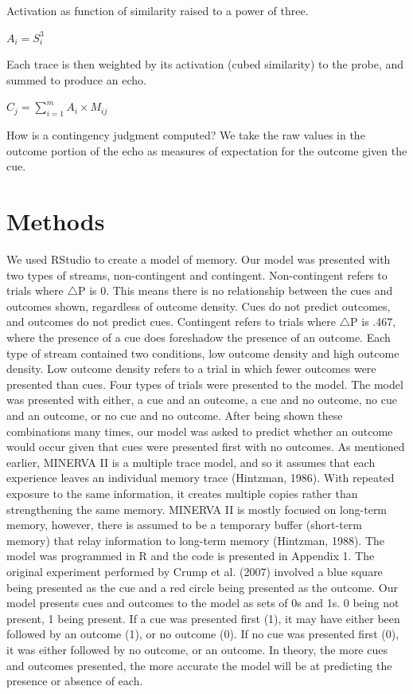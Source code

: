 \documentclass[
  english,
  man,floatsintext]{apa6}
\begin{document}
Activation as function of similarity raised to a power of three.

\(A_i = S_i^3\)

Each trace is then weighted by its activation (cubed similarity) to the probe, and summed to produce an echo.

\(C_j = \sum_{i=1}^m A_i \times M_{ij}\)

How is a contingency judgment computed? We take the raw values in the outcome portion of the echo as measures of expectation for the outcome given the cue.

\hypertarget{methods}{%
\section{Methods}\label{methods}}

We used RStudio to create a model of memory. Our model was presented with two types of streams, non-contingent and contingent. Non-contingent refers to trials where \(\triangle\)P is 0. This means there is no relationship between the cues and outcomes shown, regardless of outcome density. Cues do not predict outcomes, and outcomes do not predict cues. Contingent refers to trials where \(\triangle\)P is .467, where the presence of a cue does foreshadow the presence of an outcome. Each type of stream contained two conditions, low outcome density and high outcome density. Low outcome density refers to a trial in which fewer outcomes were presented than cues. Four types of trials were presented to the model. The model was presented with either, a cue and an outcome, a cue and no outcome, no cue and an outcome, or no cue and no outcome. After being shown these combinations many times, our model was asked to predict whether an outcome would occur given that cues were presented first with no outcomes.
As mentioned earlier, MINERVA II is a multiple trace model, and so it assumes that each experience leaves an individual memory trace (Hintzman, 1986). With repeated exposure to the same information, it creates multiple copies rather than strengthening the same memory. MINERVA II is mostly focused on long-term memory, however, there is assumed to be a temporary buffer (short-term memory) that relay information to long-term memory (Hintzman, 1988). The model was programmed in R and the code is presented in Appendix 1.
The original experiment performed by Crump et al. (2007) involved a blue square being presented as the cue and a red circle being presented as the outcome. Our model presents cues and outcomes to the model as sets of 0s and 1s. 0 being not present, 1 being present. If a cue was presented first (1), it may have either been followed by an outcome (1), or no outcome (0). If no cue was presented first (0), it was either followed by no outcome, or an outcome. In theory, the more cues and outcomes presented, the more accurate the model will be at predicting the presence or absence of each.
\end{document}
